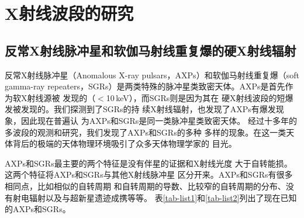 
\def\qui {1E 1547-54}
\def\uu {4U~0142$+$61}
\def\oo {1E~1048$-$59}
\def\kes {1E~1841$-$045}
\def\axj {AX~J1845$-$02}
\def\rxs {1RXS~J1708$-$40}
\def\eee {1E~2259$+$586}
\def\xte {XTE~J1810$-$197}
\def\cxo {CXOU~J1647$-$45}
\def\smc {CXOU~J0100-72}
\def\zerosei {SGR~1806$-$20}
\def\zerozero {SGR~1900$+$14}
\def\sedici {SGR~1627$-$41}
\def\lmc {SGR~0526$-$66}
\def\quil {1E 1547.0-5408}
\def\uul {4U~0142$+$61}
\def\ool {1E~1048$-$586}
\def\kesl {1E~1841$-$045}
\def\axjl {AX~J1844.8$-$0256}
\def\rxsl {1RXS~J170849$-$400910}
\def\eel {1E~2259$+$586}
\def\xtel {XTE~J1810$-$197}
\def\cxol {CXOU~J164710.2$-$455216}
\def\smcl {CXOU~J010043.1-721134}

\chapter{X射线波段的研究}

\section{反常X射线脉冲星和软伽马射线重复爆的硬X射线辐射}

反常X射线脉冲星（Anomalous X-ray pulsars，AXPs）和软伽马射线重复爆（soft gamma-ray 
repeaters，SGRs）是两类特殊的脉冲星类致密天体。AXPs是首先作为软X射线源被
发现的（$<$10\,keV）\supercite{fg81,scs86,ims94}，而SGRs则是因为其在
硬X射线波段的短爆发被发现的\supercite{mgg+79,mgi+79}。我们探测到了SGRs的持
续X射线辐射，也发现了AXPs有爆发现象，因此现在普遍认
为AXPs和SGRs是同一类脉冲星类致密天体\supercite{m08}。
%
经过十多年的多波段的观测和研究，我们发现了AXPs和SGRs的多种
多样的现象。在这一类天体背后的极端的天体物理环境吸引了众多天体物理学家的
目光\supercite{m08}。

AXPs和SGRs最主要的两个特征是没有伴星的证据和X射线光度
大于自转能损。这两个特征将AXPs和SGRs与其他X射线脉冲星
区分开来。AXPs和SGRs有很多相同点，比如相似的自转周期
和自转周期的导数、比较窄的自转周期的分布、没有射电辐射以及与超新星遗迹成携等等。
表\ref{tab-list1}和\ref{tab-list2}列出了现在已知的AXPs和SGRs\supercite{m08}。

